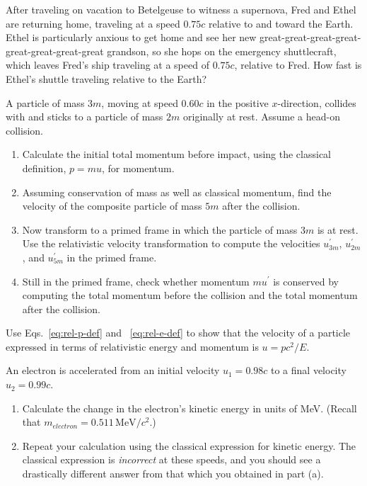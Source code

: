 \begin{exercise}
After traveling on vacation to Betelgeuse to witness a supernova, Fred
and Ethel are returning home, traveling at a speed $0.75c$ relative to
and toward the Earth.  Ethel is particularly anxious to get home and
see her new great-great-great-great-great-great-great-great grandson,
so she hops on the emergency shuttlecraft, which leaves Fred's ship
traveling at a speed of $0.75c$, relative to Fred.  How fast is Ethel's
shuttle traveling relative to the Earth?
\end{exercise}

\begin{exercise}
A particle of mass $3m$, moving at speed $0.60c$ in the positive
$x$-direction, collides with and sticks to a particle of mass $2m$
originally at rest.  Assume a head-on collision.
\begin{enumerate}
\item Calculate the initial total momentum before impact, using the
classical definition, $p = mu$, for momentum. 
\item Assuming conservation of mass as well as classical momentum,
find the velocity of the composite particle of mass $5m$ after the
collision.  
\item Now transform to a primed frame in which the particle of mass
$3m$ is at rest.  Use the relativistic velocity transformation to
compute the velocities $u^\prime_{3m}$, $u^\prime_{2m}$, and
$u^\prime_{5m}$ in the primed frame. 
\item Still in the primed frame, check whether momentum $mu^\prime$ is
conserved by computing the total momentum before the collision and the
total momentum after the collision.
\end{enumerate}
\label{prob:inelastic}
\end{exercise}


\begin{exercise}
Use Eqs.~\ref{eq:rel-p-def} and ~\ref{eq:rel-e-def}
to show that the velocity of a particle expressed in terms of
relativistic energy and momentum is $u = pc^2/E$.
\label{prob:rel-u-p-e}
\end{exercise}


\begin{exercise}
An electron is accelerated from an initial velocity $u_1 = 0.98c$ to a 
final velocity $u_2 = 0.99c$.  
\begin{enumerate}
\item Calculate the change in the electron's kinetic energy in units of 
MeV.  (Recall that $m_{ electron} = 0.511\,\text{MeV}/c^2$.) 
\item Repeat your calculation using the classical expression 
for kinetic energy.  The classical expression is \textit{incorrect}
at these speeds, and you should see a drastically different answer 
from that which you obtained in part (a).  
\end{enumerate} 
\label{prob:energy-to-accelerate}
\end{exercise}

